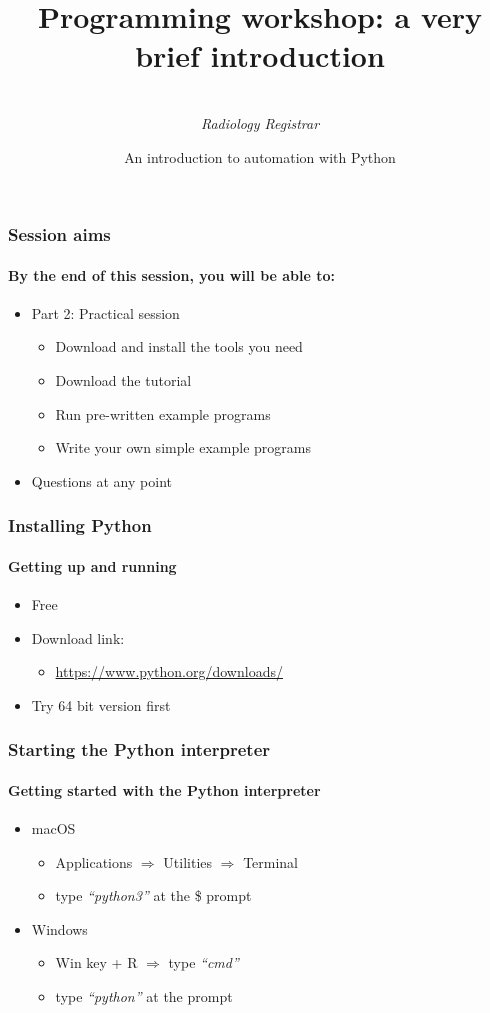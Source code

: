 \documentclass{beamer}
\title[Programming workshop]{Programming workshop: a very brief introduction}
\author{
	\sc{Mark Thurston}\\
    \textit{Radiology Registrar}
}
\institute{
	\textit{Peninsula Radiology Academy}\\
    \textit{Plymouth}
}
\date[April 2018]{An introduction to automation with Python} %
\begin{document}
    \begin{frame}[plain]
	    \titlepage
    \end{frame}


    \begin{frame}
	    \frametitle{Session aims}
	    \framesubtitle{By the end of this session, you will be able to:}

	    \begin{itemize}
		    \item Part 2: Practical session
			    \begin{itemize}
				    \item Download and install the tools you need
				    \item Download the tutorial
				    \item Run pre-written example programs
				    \item Write your own simple example programs
			    \end{itemize}
	    \end{itemize}
	    \begin{itemize}
		    \item Questions at any point
	    \end{itemize}
    \end{frame}

    \begin{frame}
	    \frametitle{Installing Python}
	    \framesubtitle{Getting up and running}

	    \begin{itemize}
		    \item Free
		    \item Download link:
			    \begin{itemize}
				    \item \url{https://www.python.org/downloads/}
			    \end{itemize}
		    \item Try 64 bit version first
	    \end{itemize}
    \end{frame}


    \begin{frame}
	    \frametitle{Starting the Python interpreter}
	    \framesubtitle{Getting started with the Python interpreter}

	    \begin{itemize}
		    \item macOS
			    \begin{itemize}
				    \item Applications $\Rightarrow$ Utilities $\Rightarrow$ Terminal
				    \item type \textit{``python3''} at the \$ prompt
			    \end{itemize}
		    \item Windows
			    \begin{itemize}
				    \item Win key + R $\Rightarrow$ type \textit{``cmd''}
				    \item type \textit{``python''} at the prompt
			    \end{itemize}
	    \end{itemize}
    \end{frame}
\end{document}
